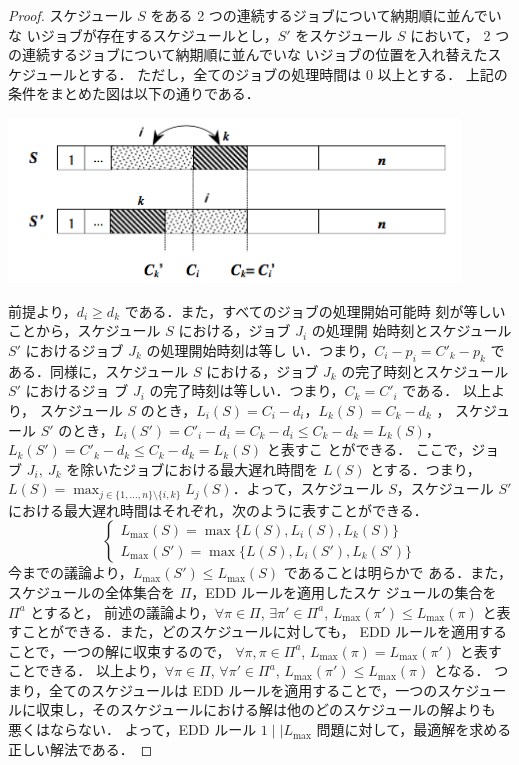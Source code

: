 \documentclass[12pt]{optlab-bachelor}
\begin{document}
\begin{proof}
  スケジュール $S$ をある 2 つの連続するジョブについて納期順に並んでいな
  いジョブが存在するスケジュールとし，$S'$ をスケジュール $S$ において，
  2 つの連続するジョブについて納期順に並んでいな
  いジョブの位置を入れ替えたスケジュールとする．
  ただし，全てのジョブの処理時間は 0 以上とする．
  上記の条件をまとめた図は以下の通りである．
  \begin{center}
    \includegraphics[width = 12cm]{EDDrule.png}
  \end{center}
  前提より，$d_i \ge d_k$ である．また，すべてのジョブの処理開始可能時
  刻が等しいことから，スケジュール $S$ における，ジョブ $J_i$ の処理開
  始時刻とスケジュール $S'$ におけるジョブ $J_k$ の処理開始時刻は等し
  い．つまり，$C_i - p_i = C'_k - p_k$ である．同様に，スケジュール
  $S$ における，ジョブ $J_k$ の完了時刻とスケジュール $S'$ におけるジョ
  ブ $J_i$ の完了時刻は等しい．つまり，$C_k = C'_i$ である．
  以上より，
  スケジュール $S$ のとき，$L_i(S) = C_i - d_i$，$L_k(S) = C_k - d_k$ ，
  スケジュール $S'$ のとき，$L_i(S') = C'_i - d_i = C_k - d_i \le C_k -
  d_k = L_k(S)$，$L_k(S') = C'_k - d_k \le C_k - d_k = L_k(S)$ と表すこ
  とができる．
  ここで，ジョブ $J_i,\ J_k$ を除いたジョブにおける最大遅れ時間を $L(S)$
  とする．つまり，$L(S) = \displaystyle \max_{j \in \{1,\ldots,n\}
  \setminus \{i,k\}}L_j(S)$．よって，スケジュール $S$，スケジュール
  $S'$ における最大遅れ時間はそれぞれ，次のように表すことができる．
  $$\left\{ \begin{array}{lll} L_{\max}(S) =
  \max\{L(S),L_i(S),L_k(S)\} \\ L_{\max}(S') =
  \max\{L(S),L_i(S'),L_k(S')\}\end{array} \right.$$
  今までの議論より，$L_{\max}(S') \le L_{\max}(S)$ であることは明らかで
  ある．また，スケジュールの全体集合を $\Pi$，EDD ルールを適用したスケ
  ジュールの集合を $\Pi^a$ とすると，
  前述の議論より，$\forall \pi \in \Pi$, $\exists \pi' \in \Pi^a$, $L_{\max}(\pi') \le
  L_{\max}(\pi)$ と表すことができる．また，どのスケジュールに対しても，
  EDD ルールを適用することで，一つの解に収束するので，
  $\forall \pi, \pi \in \Pi^a$, $L_{\max}(\pi) = L_{\max}(\pi')$ と表す
  ことできる．
  以上より，$\forall \pi \in \Pi$, $\forall
  \pi' \in \Pi^a$, $L_{\max}(\pi') \le L_{\max}(\pi)$ となる．
  つまり，全てのスケジュールは EDD ルールを適用することで，一つのスケジュー
  ルに収束し，そのスケジュールにおける解は他のどのスケジュールの解よりも
  悪くはならない．
  よって，EDD ルール $1\mid \mid L_{\max}$ 問題に対して，最適解を求める
  正しい解法である．
\end{proof}
\end{document}
